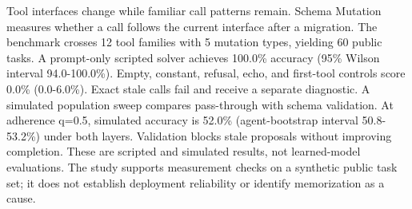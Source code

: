 Tool interfaces change while familiar call patterns remain. Schema Mutation measures whether a call follows the current interface after a migration. The benchmark crosses 12 tool families with 5 mutation types, yielding 60 public tasks. A prompt-only scripted solver achieves 100.0\% accuracy (95\% Wilson interval 94.0-100.0\%). Empty, constant, refusal, echo, and first-tool controls score 0.0\% (0.0-6.0\%). Exact stale calls fail and receive a separate diagnostic. A simulated population sweep compares pass-through with schema validation. At adherence q=0.5, simulated accuracy is 52.0\% (agent-bootstrap interval 50.8-53.2\%) under both layers. Validation blocks stale proposals without improving completion. These are scripted and simulated results, not learned-model evaluations. The study supports measurement checks on a synthetic public task set; it does not establish deployment reliability or identify memorization as a cause.
